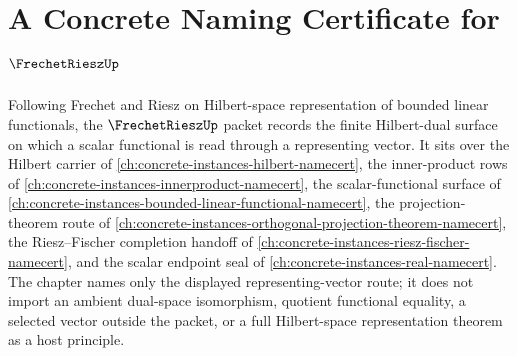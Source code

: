\chapter{A Concrete Naming Certificate for $\FrechetRieszUp$}
\label{ch:concrete-instances-frechet-riesz-namecert}

Following Frechet and Riesz on Hilbert-space representation of bounded linear functionals, the $\FrechetRieszUp$ packet records the finite Hilbert-dual surface on which a scalar functional is read through a representing vector. It sits over the Hilbert carrier of \autoref{ch:concrete-instances-hilbert-namecert}, the inner-product rows of \autoref{ch:concrete-instances-innerproduct-namecert}, the scalar-functional surface of \autoref{ch:concrete-instances-bounded-linear-functional-namecert}, the projection-theorem route of \autoref{ch:concrete-instances-orthogonal-projection-theorem-namecert}, the Riesz--Fischer completion handoff of \autoref{ch:concrete-instances-riesz-fischer-namecert}, and the scalar endpoint seal of \autoref{ch:concrete-instances-real-namecert}. The chapter names only the displayed representing-vector route; it does not import an ambient dual-space isomorphism, quotient functional equality, a selected vector outside the packet, or a full Hilbert-space representation theorem as a host principle.

